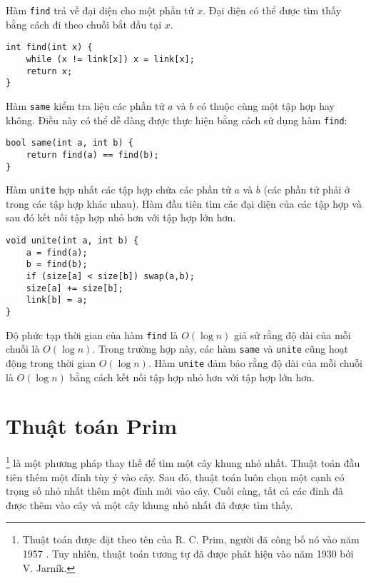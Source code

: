 Hàm \texttt{find} trả về
đại diện cho một phần tử $x$.
Đại diện có thể được tìm thấy bằng cách đi theo
chuỗi bắt đầu tại $x$.

\begin{lstlisting}
int find(int x) {
    while (x != link[x]) x = link[x];
    return x;
}
\end{lstlisting}

Hàm \texttt{same} kiểm tra
liệu các phần tử $a$ và $b$ có thuộc cùng một tập hợp hay không.
Điều này có thể dễ dàng được thực hiện bằng cách sử dụng
hàm \texttt{find}:

\begin{lstlisting}
bool same(int a, int b) {
    return find(a) == find(b);
}
\end{lstlisting}

\begin{samepage}
Hàm \texttt{unite} hợp nhất các tập hợp
chứa các phần tử $a$ và $b$
(các phần tử phải ở trong các tập hợp khác nhau).
Hàm đầu tiên tìm các đại diện
của các tập hợp và sau đó kết nối tập hợp nhỏ hơn
với tập hợp lớn hơn.

\begin{lstlisting}
void unite(int a, int b) {
    a = find(a);
    b = find(b);
    if (size[a] < size[b]) swap(a,b);
    size[a] += size[b];
    link[b] = a;
}
\end{lstlisting}
\end{samepage}

Độ phức tạp thời gian của hàm \texttt{find}
là $O(\log n)$ giả sử rằng độ dài của mỗi
chuỗi là $O(\log n)$.
Trong trường hợp này, các hàm \texttt{same} và \texttt{unite}
cũng hoạt động trong thời gian $O(\log n)$.
Hàm \texttt{unite} đảm bảo rằng
độ dài của mỗi chuỗi là $O(\log n)$ bằng cách kết nối
tập hợp nhỏ hơn với tập hợp lớn hơn.

\section{Thuật toán Prim}


\footnote{Thuật toán được
đặt theo tên của R. C. Prim, người đã công bố nó vào năm 1957 \cite{pri57}.
Tuy nhiên, thuật toán tương tự đã được phát hiện vào năm 1930
bởi V. Jarník.} là một phương pháp thay thế
để tìm một cây khung nhỏ nhất.
Thuật toán đầu tiên thêm một đỉnh tùy ý
vào cây.
Sau đó, thuật toán luôn chọn
một cạnh có trọng số nhỏ nhất
thêm một đỉnh mới vào cây.
Cuối cùng, tất cả các đỉnh đã được thêm vào cây
và một cây khung nhỏ nhất đã được tìm thấy.

